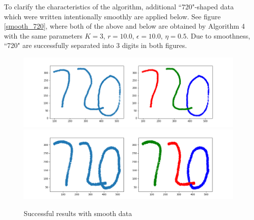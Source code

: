 \documentclass[twoside,11pt]{article}
\begin{document}
To clarify the characteristics of the algorithm, additional ``720"-shaped data which were written intentionally smoothly are applied below.  See figure \autoref{smooth_720}, where both of the above and below are obtained by Algorithm 4 with the same parameters $K = 3$, $r = 10.0$, $\epsilon = 10.0$, $\eta = 0.5$.
Due to smoothness, ``720" are successfully separated into 3 digits in both figures.

\begin{figure}[htbp]
\centering
\vspace{-1em}
\includegraphics[width=0.8  \textwidth]{smooth_720_1.png}
\includegraphics[width=0.8  \textwidth]{smooth_720_2.png}
\vspace{-1em}
\caption{Successful results with smooth data}
\label{smooth_720}
\end{figure}
\end{document}
